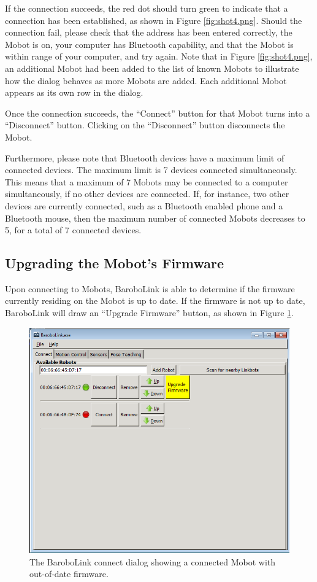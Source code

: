 \documentclass{article}
\begin{document}
If the connection succeeds, the red dot should
turn green to indicate that a connection has been established, as shown in 
Figure \ref{fig:shot4.png}.  Should the connection
fail, please check that the address has been entered correctly, the Mobot is on,
your computer has Bluetooth capability, and that the Mobot is within range of 
your computer, and try again.
Note that in Figure \ref{fig:shot4.png}, an additional
Mobot had been added to the list of known Mobots to illustrate how the dialog
behaves as more Mobots are added. Each additional Mobot appears as its own
row in the dialog.

Once the connection succeeds, the ``Connect'' button for that Mobot turns into
a ``Disconnect'' button. Clicking on the ``Disconnect'' button disconnects
the Mobot.

Furthermore, please note that Bluetooth devices have a maximum limit of connected 
devices. The maximum limit is 7 devices connected simultaneously. This means that 
a maximum of 7 Mobots may be connected to a computer simultaneously, if no
other devices are connected. If, for instance, two other devices are currently 
connected, such as a Bluetooth enabled phone and a Bluetooth mouse, then the 
maximum number of connected Mobots decreases to 5, for a total of 7 connected 
devices.

\subsection{Upgrading the Mobot's Firmware}
Upon connecting to Mobots, BaroboLink is able to determine if the firmware 
currently residing on the Mobot is up to date. If the firmware is not up to 
date, BaroboLink will draw an ``Upgrade Firmware'' button, as shown in 
Figure \ref{fig:update1}. 

\begin{figure}[H]
\begin{center}
\includegraphics[width=4.5in]{images/update1.png}
\end{center}
\caption{\label{fig:update1} The BaroboLink connect dialog showing a connected
Mobot with out-of-date firmware.}
\end{figure}
\end{document}
